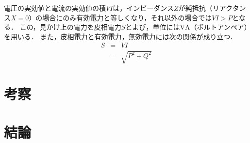 \documentclass[11pt,dvipdfmx]{ujarticle}
\begin{document}
電圧の実効値と電流の実効値の積$VI$は，インピーダンス$\dot{Z}$が純抵抗（リアクタンス$X=0$）の場合にのみ有効電力と等しくなり，それ以外の場合では$VI> P$となる．
この，見かけ上の電力を皮相電力$S$とよび，単位には$\mathrm{VA}$（ボルトアンペア）を用いる．
また，皮相電力と有効電力，無効電力には次の関係が成り立つ．
\begin{eqnarray}
	S &=& VI\nonumber\\
	&=& \sqrt{P^2+Q^2}
\end{eqnarray}




\section{考察}
\section{結論}

\newpage
\printbibliography[title=参考文献]
\end{document}
